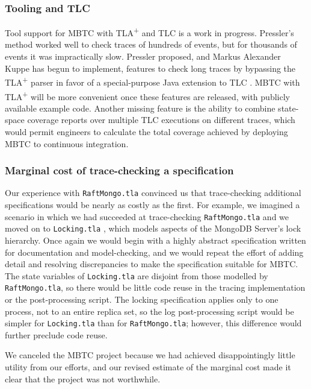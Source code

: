 \documentclass{vldb}
\begin{document}
\vspace{10 mm}

\subsubsection{Tooling and TLC}
\label{subsubsec:mbtc_tla_tlc}

Tool support for MBTC with TLA\textsuperscript{+} and TLC is a work in progress. 
Pressler's method worked well to check traces of hundreds of events, but for thousands of events it was impractically slow. 
Pressler proposed, and Markus Alexander Kuppe has begun to implement, features to check long traces by bypassing the TLA\textsuperscript{+} parser in favor of a special-purpose Java extension to TLC \cite{TLAPlusIssue413}. 
MBTC with TLA\textsuperscript{+} will be more convenient once these features are released, with publicly available example code. 
Another missing feature is the ability to combine state-space coverage reports over multiple TLC executions on different traces, which would permit engineers to calculate the total coverage achieved by deploying MBTC to continuous integration.

\subsubsection{Marginal cost of trace-checking a specification}
\label{subsubsec:marginal_cost}

Our experience with \texttt{RaftMongo.tla} convinced us that trace-checking additional specifications would be nearly as costly as the first.
For example, we imagined a scenario in which we had succeeded at trace-checking \texttt{RaftMongo.tla} and we moved on to \texttt{Locking.tla} \cite{LockingTLA}, which models aspects of the MongoDB Server's lock hierarchy.
Once again we would begin with a highly abstract specification written for documentation and model-checking, and we would repeat the effort of adding detail and resolving discrepancies to make the specification suitable for MBTC.
The state variables of \texttt{Locking.tla} are disjoint from those modelled by \texttt{RaftMongo.tla}, so there would be little code reuse in the tracing implementation or the post-processing script.
The locking specification applies only to one process, not to an entire replica set, so the log post-processing script would be simpler for \texttt{Locking.tla} than for \texttt{RaftMongo.tla}; however, this difference would further preclude code reuse.

We canceled the MBTC project because we had achieved disappointingly little utility from our efforts, and our revised estimate of the marginal cost made it clear that the project was not worthwhile.
\end{document}
